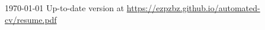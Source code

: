 \documentclass[11pt, a4paper]{awesome-cv}
\begin{document}
\makecvheader[C]

\makecvfooter
{\today}
{Up-to-date version at \upshape\color{text}\url{https://ezpzbz.github.io/automated-cv/resume.pdf}}
{\thepage}



\medskip
\vspace{1em}

\vspace{-1em}

%
\medskip

\end{document}

